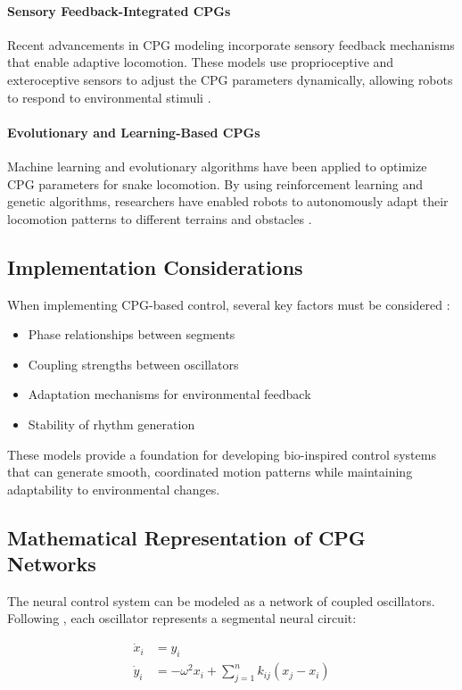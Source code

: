 \documentclass[12pt,a4paper]{report}
\begin{document}
\paragraph{Sensory Feedback-Integrated CPGs}
Recent advancements in CPG modeling incorporate sensory feedback mechanisms that enable adaptive locomotion. These models use proprioceptive and exteroceptive sensors to adjust the CPG parameters dynamically, allowing robots to respond to environmental stimuli \cite{inoue2004neural}.

\paragraph{Evolutionary and Learning-Based CPGs}
Machine learning and evolutionary algorithms have been applied to optimize CPG parameters for snake locomotion. By using reinforcement learning and genetic algorithms, researchers have enabled robots to autonomously adapt their locomotion patterns to different terrains and obstacles \cite{ijspeert1999evolution}.

\subsection{Implementation Considerations}
When implementing CPG-based control, several key factors must be considered \parencite{wang2020cpg}:
\begin{itemize}
    \item Phase relationships between segments
    \item Coupling strengths between oscillators
    \item Adaptation mechanisms for environmental feedback
    \item Stability of rhythm generation
\end{itemize}

These models provide a foundation for developing bio-inspired control systems that can generate smooth, coordinated motion patterns while maintaining adaptability to environmental changes.

\subsection{Mathematical Representation of CPG Networks}
The neural control system can be modeled as a network of coupled oscillators. Following \textcite{wang2020cpg}, each oscillator represents a segmental neural circuit:

\begin{equation}
    \begin{split}
    \dot{x}_i &= y_i \\
    \dot{y}_i &= -\omega^2x_i + \sum_{j=1}^n k_{ij}(x_j - x_i)
    \end{split}
\end{equation}
\end{document}
